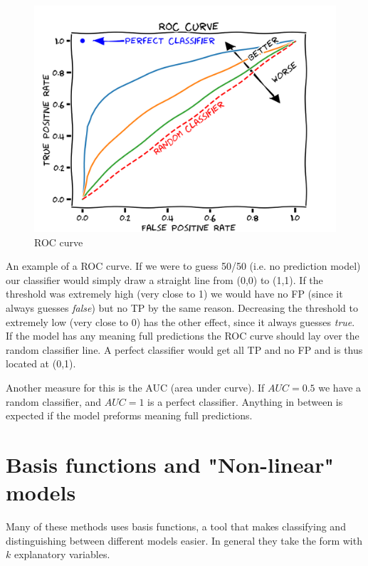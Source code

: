 \documentclass{article}
\begin{document}
\begin{minipage}{0.5\textwidth}
\begin{figure}[H]
\includegraphics[width=1.1\linewidth]{roc.png}
\caption{\label{fig:roc} ROC curve}
\end{figure}
\end{minipage} \hfill
\begin{minipage}{0.5\textwidth}
An example of a ROC curve. If we were to guess 50/50 (i.e. no prediction model) our classifier would simply draw a straight line from (0,0) to (1,1). If the threshold was extremely high (very close to 1) we would have no FP (since it always guesses \textit{false}) but no TP by the same reason. Decreasing the threshold to extremely low (very close to 0) has the other effect, since it always guesses \textit{true}. If the model has any meaning full predictions the ROC curve should lay over the random classifier line. A perfect classifier would get all TP and no FP and is thus located at (0,1). 
\end{minipage}

Another measure for this is the AUC (area under curve). If $AUC = 0.5$ we have a random classifier, and $AUC = 1$ is a perfect classifier. Anything in between is expected if the model preforms meaning full predictions. 

\section{Basis functions and "Non-linear" models}

Many of these methods uses basis functions, a tool that makes classifying and distinguishing between different models easier. In general they take the form with $k$ explanatory variables.
\end{document}

